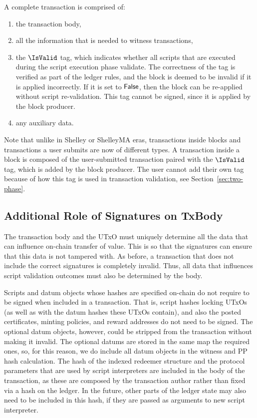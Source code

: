 A complete transaction is comprised of:

\begin{enumerate}
  \item the transaction body,
  \item all the information that is needed to witness transactions,
  \item the $\IsValid$ tag, which indicates whether all scripts
  that are executed during the script execution phase validate.
  The correctness of the tag is verified as part of the ledger rules, and the block is
  deemed to be invalid if it is applied incorrectly.
  If it is set to $\mathsf{False}$, then the block can be re-applied without script re-validation.
  This tag cannot be signed, since it is applied by the block producer.
  \item any auxiliary data.
\end{enumerate}

Note that unlike in Shelley or ShelleyMA eras, transactions inside blocks and transactions
a user submits are now of different types. A transaction inside a block is composed of
the user-submitted transaction paired with the $\IsValid$ tag, which is
added by the block producer. The user cannot
add their own tag because of how this tag is used in transaction validation, see
Section~\ref{sec:two-phase}.

\subsection{Additional Role of Signatures on TxBody}

The transaction body and the UTxO must uniquely determine all the data
that can influence on-chain transfer of value.
This is so that the signatures can ensure that this data is not tampered with.
As before, a transaction that does not include the correct signatures is completely invalid.
Thus, all data that influences script validation outcomes must also be determined by the body.

Scripts and datum objects whose hashes are specified on-chain do not require to be
signed when included in a transaction. That is, script hashes locking UTxOs (as well as
with the datum hashes these UTxOs contain), and also the posted
certificates, minting policies, and reward addresses do not need to be signed.
The optional datum objects, however, could be stripped from the transaction without making
it invalid. The optional datums are stored in the same map the required ones, so,
for this reason, we do include all datum objects in the witness and PP hash calculation.
%
The hash of the indexed redeemer structure and the protocol parameters that are used by
script interpreters are included in the body of the transaction, as these are composed
by the transaction author rather than
fixed via a hash on the ledger. In the future, other parts of the ledger
state may also need to be included in this hash, if they are passed as
arguments to new script interpreter.


